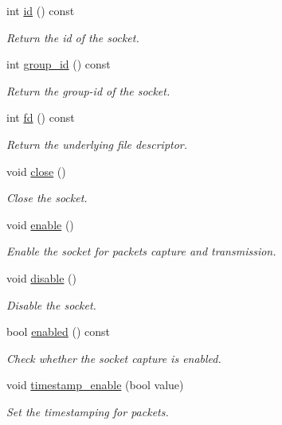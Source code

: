 \begin{DoxyCompactItemize}
int \hyperlink{classpfq_1_1socket_af3f79e9a42964907acd581d35d42da00}{id} () const 
\begin{DoxyCompactList}\small\item\em Return the id of the socket. \end{DoxyCompactList}\item 
int \hyperlink{classpfq_1_1socket_a0b82186997f22efffd336b09b19a806d}{group\+\_\+id} () const 
\begin{DoxyCompactList}\small\item\em Return the group-\/id of the socket. \end{DoxyCompactList}\item 
int \hyperlink{classpfq_1_1socket_ad4f1a171d31215afd6aad769a5e4b004}{fd} () const 
\begin{DoxyCompactList}\small\item\em Return the underlying file descriptor. \end{DoxyCompactList}\item 
void \hyperlink{classpfq_1_1socket_a4c179188ea8fceeb5fd47d52f93c6bda}{close} ()
\begin{DoxyCompactList}\small\item\em Close the socket. \end{DoxyCompactList}\item 
void \hyperlink{classpfq_1_1socket_a5b25af762946405695f4192b08c04146}{enable} ()
\begin{DoxyCompactList}\small\item\em Enable the socket for packets capture and transmission. \end{DoxyCompactList}\item 
void \hyperlink{classpfq_1_1socket_ac7e918bff7d1672125a8549dae750dcc}{disable} ()
\begin{DoxyCompactList}\small\item\em Disable the socket. \end{DoxyCompactList}\item 
bool \hyperlink{classpfq_1_1socket_acec42300a779676e326844209c1c0948}{enabled} () const 
\begin{DoxyCompactList}\small\item\em Check whether the socket capture is enabled. \end{DoxyCompactList}\item 
void \hyperlink{classpfq_1_1socket_ab21f7cd8d22e57ec28b3038d259561bc}{timestamp\+\_\+enable} (bool value)
\begin{DoxyCompactList}\small\item\em Set the timestamping for packets. \end{DoxyCompactList}\item 

\end{DoxyCompactItemize}

